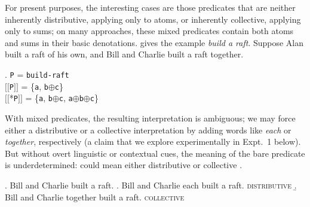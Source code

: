 \documentclass[linguex]{sp}
\newcommand{\sem}[1]{\mbox{$[\![$#1$]\!]$}}
\renewcommand{\tt}{\texttt}
\newcommand{\op}{$\oplus$}
\begin{document}

For present purposes, the interesting cases are those predicates that are neither inherently distributive, applying only to atoms, or inherently collective, applying only to sums; on many approaches, these mixed predicates contain both atoms and sums in their basic denotations. \citeauthor{link1983} gives the example \emph{build a raft}. Suppose Alan built a raft of his own, and Bill and Charlie built a raft together.

\ex. \tt{P} = \tt{build-raft}\\
\sem{\tt{P}} = \{\tt{a}, \tt{b}\op\tt{c}\}\\
\sem{*\tt{P}} = \{\tt{a}, \tt{b}\op\tt{c}, \tt{a}\op\tt{b}\op\tt{c}\}

With mixed predicates, the resulting interpretation is ambiguous; we may force either a distributive or a collective interpretation by adding words like \emph{each} or \emph{together}, respectively (a claim that we explore experimentally in Expt.~1 below). But without overt linguistic or contextual cues, the meaning of the bare predicate is underdetermined: \Next could mean either distributive \Next[a] or collective \Next[b].


\ex. Bill and Charlie built a raft.
\a. Bill and Charlie each built a raft. \hfill \textsc{distributive}
\b. Bill and Charlie together built a raft. \hfill \textsc{collective}


%
%
%
%
%
%
\end{document}
